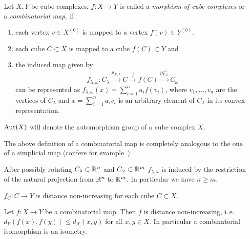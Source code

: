 \begin{defin}
  \label{def:morphism-ccc}
  Let \(X,Y\) be cube complexes. \(f\colon X \to Y\) is called a \emph{morphism of cube complexes} or a \emph{combinatorial map}, if
  \begin{enumerate}
  \item each vertex \(v \in X^{(0)}\) is mapped to a vertex \(f(v) \in Y^{(0)}\),
  \item each cube \(C \subset X\) is mapped to a cube \(f(C) \subset Y\) and
  \item the induced map given by
    \[
      f_{\lambda, \omega}\colon C_\lambda \xrightarrow{p_{X,\lambda}} C \xrightarrow{f} f(C) \xrightarrow{p^{-1}_{Y,\omega}} C_\omega
    \]
    can be represented as \(f_{\lambda,\omega}(x) = \sum_{i=1}^n a_i f(v_i)\), where \(v_1, \dots, v_n\) are the vertices of \(C_\lambda\) and \(x = \sum_{i=1}^n a_i v_i\) is an arbitrary element of \(C_\lambda\) in its convex representation.
  \end{enumerate}
  \(\operatorname{Aut}(X)\) will denote the automorphism group of a cube complex \(X\).
\end{defin}

\begin{rem}
  The above definition of a combinatorial map is completely analogous to the one of a simplicial map (confere for example~\cite{Singer}).
\end{rem}

\begin{lemma}
  After possibly rotating \(C_\lambda \subset \mathbb{R}^n\) and \(C_\omega \subset \mathbb{R}^m\) \(f_{\lambda, \omega}\) is induced by the restriction of the natural projection from \(\mathbb{R}^n\) to \(\mathbb{R}^m\). In particular we have \(n \geq m\).
\end{lemma}

\begin{cor}
  \(f_C\colon C \to Y\) is distance non-increasing for each cube \(C \subset X\).
\end{cor}

\begin{prop}
  Let \(f\colon X \to Y\) be a combinatorial map. Then \(f\) is distance non-increasing, i.\,e.\ \(d_Y(f(x), f(y)) \leq d_X(x,y)\) for all \(x,y \in X\). In particular a combinatorial isomorphism is an isometry.
\end{prop}

